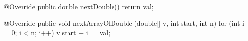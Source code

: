 
\begin{code}\begin{hide}
   @Override
   public double nextDouble() {
      return val;
   }

   @Override
   public void nextArrayOfDouble (double[] v, int start, int n) {
      for (int i = 0; i < n; i++)
         v[start + i] = val;
   }\end{hide}
\end{code}

\begin{hide}\begin{code}
}\end{code}
\end{hide}

